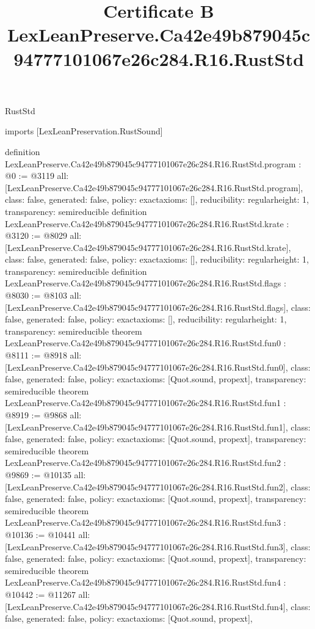 \begin{lexlean}{RustStd}
\title{Certificate B LexLeanPreserve.Ca42e49b879045c94777101067e26c284.R16.RustStd}
\begin{coremodule}
imports [LexLeanPreservation.RustSound]

definition LexLeanPreserve.Ca42e49b879045c94777101067e26c284.R16.RustStd.program : @0 := @3119 {
  all: [LexLeanPreserve.Ca42e49b879045c94777101067e26c284.R16.RustStd.program],
  class: false,
  generated: false,
  policy: exact{axioms: []},
  reducibility: regular{height: 1},
  transparency: semireducible
}
definition LexLeanPreserve.Ca42e49b879045c94777101067e26c284.R16.RustStd.krate : @3120 := @8029 {
  all: [LexLeanPreserve.Ca42e49b879045c94777101067e26c284.R16.RustStd.krate],
  class: false,
  generated: false,
  policy: exact{axioms: []},
  reducibility: regular{height: 1},
  transparency: semireducible
}
definition LexLeanPreserve.Ca42e49b879045c94777101067e26c284.R16.RustStd.flags : @8030 := @8103 {
  all: [LexLeanPreserve.Ca42e49b879045c94777101067e26c284.R16.RustStd.flags],
  class: false,
  generated: false,
  policy: exact{axioms: []},
  reducibility: regular{height: 1},
  transparency: semireducible
}
theorem LexLeanPreserve.Ca42e49b879045c94777101067e26c284.R16.RustStd.fun0 : @8111 := @8918 {
  all: [LexLeanPreserve.Ca42e49b879045c94777101067e26c284.R16.RustStd.fun0],
  class: false,
  generated: false,
  policy: exact{axioms: [Quot.sound, propext]},
  transparency: semireducible
}
theorem LexLeanPreserve.Ca42e49b879045c94777101067e26c284.R16.RustStd.fun1 : @8919 := @9868 {
  all: [LexLeanPreserve.Ca42e49b879045c94777101067e26c284.R16.RustStd.fun1],
  class: false,
  generated: false,
  policy: exact{axioms: [Quot.sound, propext]},
  transparency: semireducible
}
theorem LexLeanPreserve.Ca42e49b879045c94777101067e26c284.R16.RustStd.fun2 : @9869 := @10135 {
  all: [LexLeanPreserve.Ca42e49b879045c94777101067e26c284.R16.RustStd.fun2],
  class: false,
  generated: false,
  policy: exact{axioms: [Quot.sound, propext]},
  transparency: semireducible
}
theorem LexLeanPreserve.Ca42e49b879045c94777101067e26c284.R16.RustStd.fun3 : @10136 := @10441 {
  all: [LexLeanPreserve.Ca42e49b879045c94777101067e26c284.R16.RustStd.fun3],
  class: false,
  generated: false,
  policy: exact{axioms: [Quot.sound, propext]},
  transparency: semireducible
}
theorem LexLeanPreserve.Ca42e49b879045c94777101067e26c284.R16.RustStd.fun4 : @10442 := @11267 {
  all: [LexLeanPreserve.Ca42e49b879045c94777101067e26c284.R16.RustStd.fun4],
  class: false,
  generated: false,
  policy: exact{axioms: [Quot.sound, propext]},
}
\end{coremodule}
\end{lexlean}

